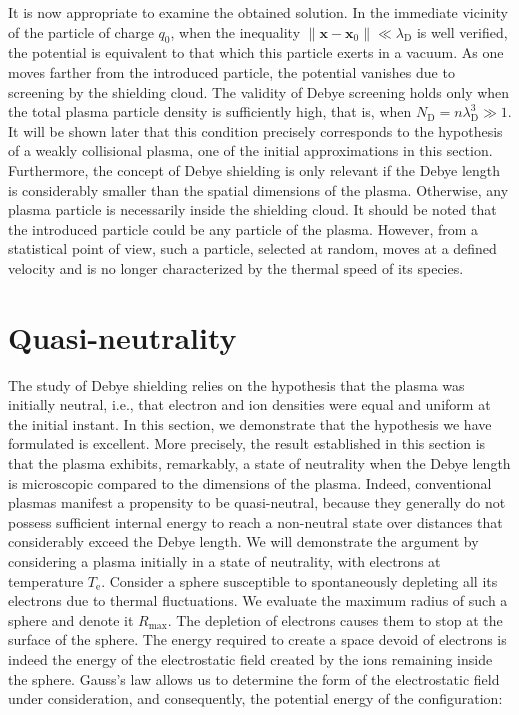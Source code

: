 It is now appropriate to examine the obtained solution. In the immediate vicinity of the particle of charge $q_0$, when the inequality $\|\mathbf{x}-\mathbf{x}_0\|\ll\lambda_\mathrm{D}$ is well verified, the potential is equivalent to that which this particle exerts in a vacuum. As one moves farther from the introduced particle, the potential vanishes due to screening by the shielding cloud. The validity of Debye screening holds only when the total plasma particle density is sufficiently high, that is, when $N_{\mathrm{D}}=n\lambda_\mathrm{D}^3\gg1$. It will be shown later that this condition precisely corresponds to the hypothesis of a weakly collisional plasma, one of the initial approximations in this section. Furthermore, the concept of Debye shielding is only relevant if the Debye length is considerably smaller than the spatial dimensions of the plasma. Otherwise, any plasma particle is necessarily inside the shielding cloud. It should be noted that the introduced particle could be any particle of the plasma. However, from a statistical point of view, such a particle, selected at random, moves at a defined velocity and is no longer characterized by the thermal speed of its species.

\section{Quasi-neutrality}

The study of Debye shielding relies on the hypothesis that the plasma was initially neutral, i.e., that electron and ion densities were equal and uniform at the initial instant. In this section, we demonstrate that the hypothesis we have formulated is excellent. More precisely, the result established in this section is that the plasma exhibits, remarkably, a state of neutrality when the Debye length is microscopic compared to the dimensions of the plasma. Indeed, conventional plasmas manifest a propensity to be quasi-neutral, because they generally do not possess sufficient internal energy to reach a non-neutral state over distances that considerably exceed the Debye length.  We will demonstrate the argument by considering a plasma initially in a state of neutrality, with electrons at temperature $T_\text{e}$. Consider a sphere susceptible to spontaneously depleting all its electrons due to thermal fluctuations. We evaluate the maximum radius of such a sphere and denote it $R_\text{max}$. The depletion of electrons causes them to stop at the surface of the sphere. The energy required to create a space devoid of electrons is indeed the energy of the electrostatic field created by the ions remaining inside the sphere. Gauss's law allows us to determine the form of the electrostatic field under consideration, and consequently, the potential energy of the configuration:

